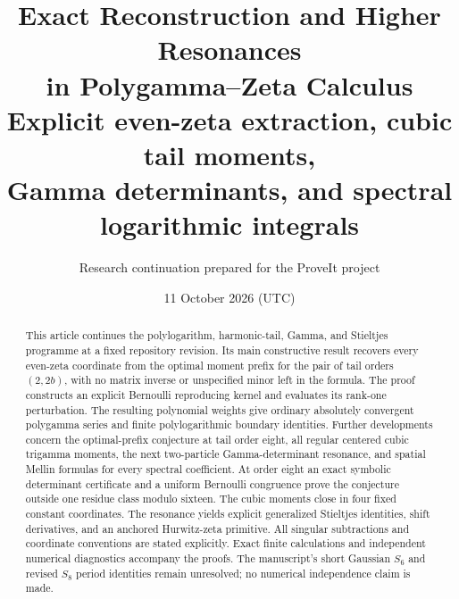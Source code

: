 \documentclass[11pt,letterpaper]{article}
\title{\color{ink}\textbf{Exact Reconstruction and Higher Resonances\\in Polygamma--Zeta Calculus}\\[.6em]
\large Explicit even-zeta extraction, cubic tail moments,\\Gamma determinants, and spectral logarithmic integrals}
\author{Research continuation prepared for the ProveIt project}
\date{11 October 2026 (UTC)}
\theoremstyle{definition}
\theoremstyle{remark}
\numberwithin{equation}{section}
\begin{document}
\maketitle
\begin{abstract}
This article continues the polylogarithm, harmonic-tail, Gamma, and
Stieltjes programme at a fixed repository revision. Its main constructive
result recovers every even-zeta coordinate from the optimal moment prefix
for the pair of tail orders $(2,2b)$, with no matrix inverse or unspecified
minor left in the formula. The proof constructs an explicit Bernoulli
reproducing kernel and evaluates its rank-one perturbation. The resulting
polynomial weights give ordinary absolutely convergent polygamma series
and finite polylogarithmic boundary identities. Further developments concern
the optimal-prefix conjecture at tail order eight, all regular centered
cubic trigamma moments, the next two-particle Gamma-determinant
resonance, and spatial Mellin formulas for every spectral coefficient.
At order eight an exact symbolic determinant certificate and a uniform
Bernoulli congruence prove the conjecture outside one residue class
modulo sixteen. The cubic moments close in four fixed constant
coordinates. The resonance yields explicit generalized Stieltjes
identities, shift derivatives, and an anchored Hurwitz-zeta primitive.
All singular subtractions and coordinate conventions are stated explicitly.
Exact finite calculations and independent numerical diagnostics accompany
the proofs. The manuscript's short Gaussian $S_6$ and revised $S_8$ period
identities remain unresolved; no numerical independence claim is made.
\end{abstract}
\tableofcontents
\newpage










\end{document}
